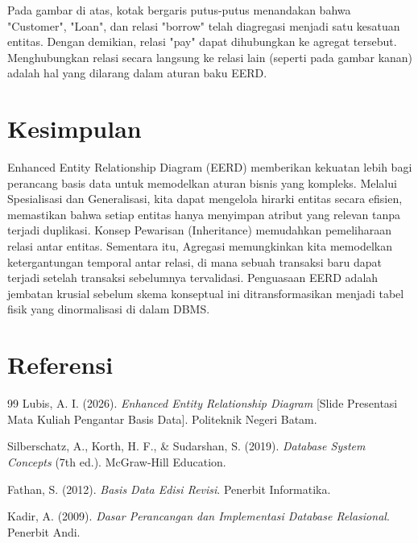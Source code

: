 \documentclass[11pt,a4paper]{article}
\begin{document}
Pada gambar di atas, kotak bergaris putus-putus menandakan bahwa "Customer", "Loan", dan relasi "borrow" telah diagregasi menjadi satu kesatuan entitas. Dengan demikian, relasi "pay" dapat dihubungkan ke agregat tersebut. Menghubungkan relasi secara langsung ke relasi lain (seperti pada gambar kanan) adalah hal yang dilarang dalam aturan baku EERD.

\section{Kesimpulan}

Enhanced Entity Relationship Diagram (EERD) memberikan kekuatan lebih bagi perancang basis data untuk memodelkan aturan bisnis yang kompleks. Melalui Spesialisasi dan Generalisasi, kita dapat mengelola hirarki entitas secara efisien, memastikan bahwa setiap entitas hanya menyimpan atribut yang relevan tanpa terjadi duplikasi. Konsep Pewarisan (Inheritance) memudahkan pemeliharaan relasi antar entitas. Sementara itu, Agregasi memungkinkan kita memodelkan ketergantungan temporal antar relasi, di mana sebuah transaksi baru dapat terjadi setelah transaksi sebelumnya tervalidasi. Penguasaan EERD adalah jembatan krusial sebelum skema konseptual ini ditransformasikan menjadi tabel fisik yang dinormalisasi di dalam DBMS.

\newpage
\section*{Referensi}

\begin{thebibliography}{99}
	Lubis, A. I. (2026). \textit{Enhanced Entity Relationship Diagram} [Slide Presentasi Mata Kuliah Pengantar Basis Data]. Politeknik Negeri Batam.

	Silberschatz, A., Korth, H. F., \& Sudarshan, S. (2019). \textit{Database System Concepts} (7th ed.). McGraw-Hill Education.

	Fathan, S. (2012). \textit{Basis Data Edisi Revisi}. Penerbit Informatika.

	Kadir, A. (2009). \textit{Dasar Perancangan dan Implementasi Database Relasional}. Penerbit Andi.
\end{thebibliography}
\end{document}
